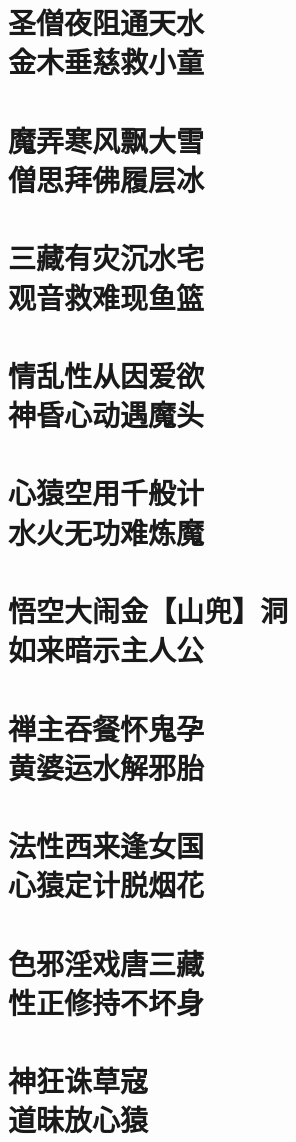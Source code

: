 \documentclass[a4paper,12pt,UTF8,twoside]{ctexbook}
\begin{document}
\chapter[圣僧夜阻通天水\ 金木垂慈救小童]{圣僧夜阻通天水\\金木垂慈救小童}
\chapter[魔弄寒风飘大雪\ 僧思拜佛履层冰]{魔弄寒风飘大雪\\僧思拜佛履层冰}
\chapter[三藏有灾沉水宅\ 观音救难现鱼篮]{三藏有灾沉水宅\\观音救难现鱼篮}
\chapter[情乱性从因爱欲\ 神昏心动遇魔头]{情乱性从因爱欲\\神昏心动遇魔头}
\chapter[心猿空用千般计\ 水火无功难炼魔]{心猿空用千般计\\水火无功难炼魔}
\chapter[悟空大闹金【山兜】洞\ 如来暗示主人公]{悟空大闹金【山兜】洞\\如来暗示主人公}
\chapter[禅主吞餐怀鬼孕\ 黄婆运水解邪胎]{禅主吞餐怀鬼孕\\黄婆运水解邪胎}
\chapter[法性西来逢女国\ 心猿定计脱烟花]{法性西来逢女国\\心猿定计脱烟花}
\chapter[色邪淫戏唐三藏\ 性正修持不坏身]{色邪淫戏唐三藏\\性正修持不坏身}
\chapter[神狂诛草寇\ 道昧放心猿]{神狂诛草寇\\道昧放心猿}
\end{document}
